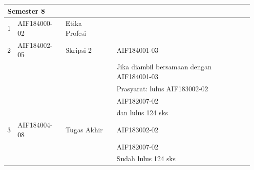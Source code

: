 \documentclass[a4paper,twoside]{article}
\begin{document}
\begin{enumerate}
\begin{enumerate}
\begin{table}[H]
\begin{tabular}{|p{0.5cm}|p{2.85cm}|p{4.95cm}|p{2.7cm}|p{2.7cm}|}
\multicolumn{5}{|l|}{\textbf{Semester 8}} \\ \hline
1 & AIF184000-02 & Etika Profesi &  &  \\ \hline
2 & AIF184002-05 & Skripsi 2 &  & AIF184001-03 \\ 
 &  &  &  & Jika diambil bersamaan dengan AIF184001-03 \\ 
 &  &  &  & Prasyarat: lulus AIF183002-02 \\ 
 &  &  &  & AIF182007-02 \\
 &  &  &  & dan lulus 124 sks \\ \hline
3 & AIF184004-08 & Tugas Akhir &  & AIF183002-02 \\ 
 &  &  &  & AIF182007-02 \\
 &  &  &  & Sudah lulus 124 sks \\ \hline
		\end{tabular}
	\label{tab:DaftarMataKuliahWajibDanPrasyaratnya2}
\end{table}


\end{enumerate}
\end{enumerate}
\end{document}
